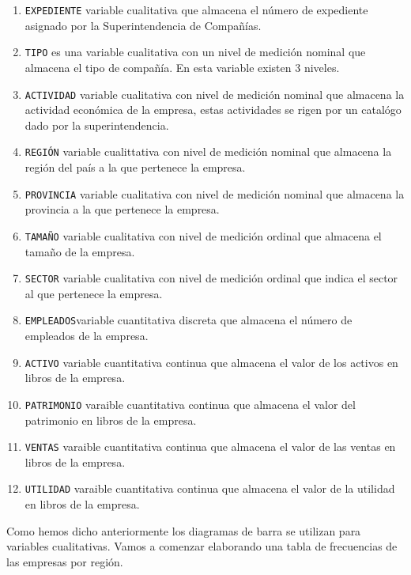\documentclass[]{book}
\providecommand{\tightlist}{%
  \setlength{\itemsep}{0pt}\setlength{\parskip}{0pt}}
\begin{document}
\begin{enumerate}
\def\labelenumi{\arabic{enumi}.}
\tightlist
\item
  \texttt{EXPEDIENTE} variable cualitativa que almacena el número de expediente asignado por la Superintendencia de Compañías.
\item
  \texttt{TIPO} es una variable cualitativa con un nivel de medición nominal que almacena el tipo de compañía. En esta variable existen 3 niveles.
\item
  \texttt{ACTIVIDAD} variable cualitativa con nivel de medición nominal que almacena la actividad económica de la empresa, estas actividades se rigen por un catalógo dado por la superintendencia.
\item
  \texttt{REGIÓN} variable cualittativa con nivel de medición nominal que almacena la región del país a la que pertenece la empresa.
\item
  \texttt{PROVINCIA} variable cualitativa con nivel de medición nominal que almacena la provincia a la que pertenece la empresa.
\item
  \texttt{TAMAÑO} variable cualitativa con nivel de medición ordinal que almacena el tamaño de la empresa.
\item
  \texttt{SECTOR} variable cualitativa con nivel de medición ordinal que indica el sector al que pertenece la empresa.
\item
  \texttt{EMPLEADOS}variable cuantitativa discreta que almacena el número de empleados de la empresa.
\item
  \texttt{ACTIVO} variable cuantitativa continua que almacena el valor de los activos en libros de la empresa.
\item
  \texttt{PATRIMONIO} varaible cuantitativa continua que almacena el valor del patrimonio en libros de la empresa.
\item
  \texttt{VENTAS} varaible cuantitativa continua que almacena el valor de las ventas en libros de la empresa.
\item
  \texttt{UTILIDAD} varaible cuantitativa continua que almacena el valor de la utilidad en libros de la empresa.
\end{enumerate}

Como hemos dicho anteriormente los diagramas de barra se utilizan para variables cualitativas. Vamos a comenzar elaborando una tabla de frecuencias de las empresas por región.
\end{document}
